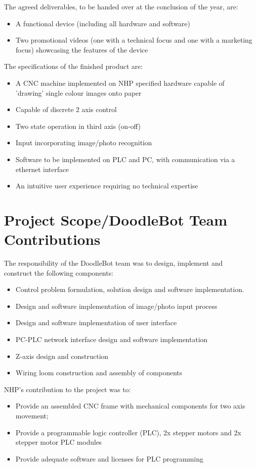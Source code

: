 The agreed deliverables, to be handed over at the conclusion of the year, are:
	\begin{itemize}
		\item A functional device (including all hardware and software)
		\item Two promotional videos (one with a technical focus and one with a marketing focus) showcasing the features of the device
	\end{itemize}	

The specifications of the finished product are:
	\begin{itemize}
		\item A CNC machine implemented on NHP specified hardware capable of 'drawing' single colour images onto paper
		\item Capable of discrete 2 axis control
		\item Two state operation in third axis (on-off)
		\item Input incorporating image/photo recognition
		\item Software to be implemented on PLC and PC, with communication via a ethernet interface
		\item An intuitive user experience requiring no technical expertise
	\end{itemize}

\section{Project Scope/DoodleBot Team Contributions}
The responsibility of the DoodleBot team was to design, implement and construct the following components:
	\begin{itemize}
		\item Control problem formulation, solution design and software implementation. 
		\item Design and software implementation of image/photo input process
		\item Design and software implementation of user interface
		\item PC-PLC network interface design and software implementation
		\item Z-axis design and construction
		\item Wiring loom construction and assembly of components
	\end{itemize}
	
NHP's contribution to the project was to:
	\begin{itemize}
		\item Provide an assembled CNC frame with mechanical components for two axis movement;
		\item Provide a programmable logic controller (PLC), 2x stepper motors and 2x stepper motor PLC modules
		\item Provide adequate software and licenses for PLC programming
	\end{itemize}



